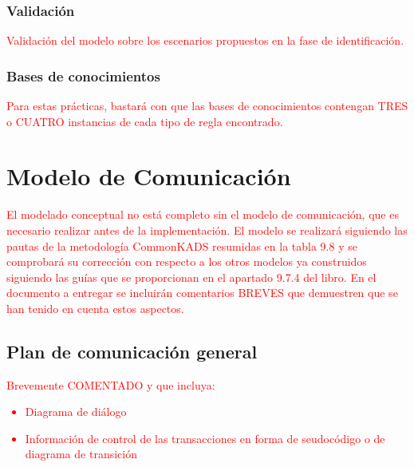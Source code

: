 \documentclass[12pt,a4paper,twoside,spanish]{article}      %
\begin{document}
\subsubsection{Validación}

\textcolor {red} {Validación del modelo sobre los escenarios propuestos en la fase de identificación.}

\subsubsection{Bases de conocimientos}

\textcolor {red} {Para estas prácticas, bastará con que las bases de conocimientos contengan TRES o CUATRO instancias de cada tipo de regla encontrado.}

\section{Modelo de Comunicación}

\textcolor {red} {El modelado conceptual no está completo sin el modelo de comunicación, que es necesario realizar antes de la implementación. El modelo se realizará siguiendo las pautas de la metodología CommonKADS resumidas en la tabla 9.8 y se comprobará su corrección con respecto a los otros modelos ya construidos siguiendo las guías que se proporcionan en el apartado 9.7.4 del libro. En el documento a entregar se incluirán comentarios BREVES que demuestren que se han tenido en cuenta estos aspectos.}

\subsection{Plan de comunicación general}

\textcolor {red}
{
Brevemente COMENTADO y que incluya:
\begin{itemize}
 \item Diagrama de diálogo
 \item Información de control de las transacciones en forma de
seudocódigo o de diagrama de transición
\end{itemize}
}
\end{document}
